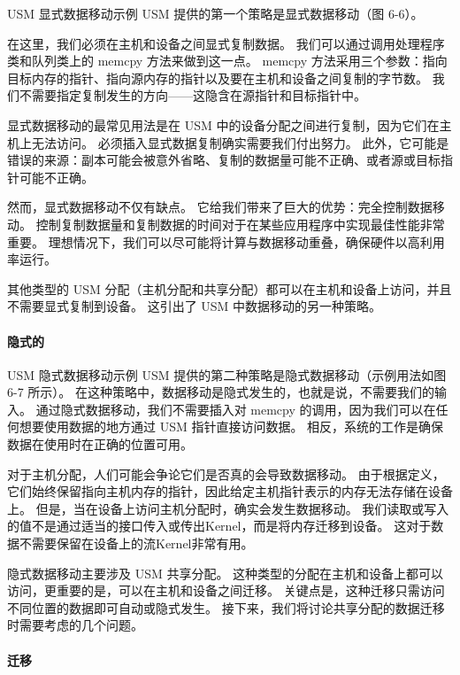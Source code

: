 {\color{red} USM 显式数据移动示例}
USM 提供的第一个策略是显式数据移动（图 6-6）。

在这里，我们必须在主机和设备之间显式复制数据。 我们可以通过调用处理程序类和队列类上的 memcpy 方法来做到这一点。 
memcpy 方法采用三个参数：指向目标内存的指针、指向源内存的指针以及要在主机和设备之间复制的字节数。 
我们不需要指定复制发生的方向——这隐含在源指针和目标指针中。

显式数据移动的最常见用法是在 USM 中的设备分配之间进行复制，因为它们在主机上无法访问。 
必须插入显式数据复制确实需要我们付出努力。 
此外，它可能是错误的来源：副本可能会被意外省略、复制的数据量可能不正确、或者源或目标指针可能不正确。

然而，显式数据移动不仅有缺点。 它给我们带来了巨大的优势：完全控制数据移动。 
控制复制数据量和复制数据的时间对于在某些应用程序中实现最佳性能非常重要。 
理想情况下，我们可以尽可能将计算与数据移动重叠，确保硬件以高利用率运行。

其他类型的 USM 分配（主机分配和共享分配）都可以在主机和设备上访问，并且不需要显式复制到设备。 
这引出了 USM 中数据移动的另一种策略。

\paragraph{隐式的}

{\color{red} USM 隐式数据移动示例}
USM 提供的第二种策略是隐式数据移动（示例用法如图 6-7 所示）。 
在这种策略中，数据移动是隐式发生的，也就是说，不需要我们的输入。 
通过隐式数据移动，我们不需要插入对 memcpy 的调用，因为我们可以在任何想要使用数据的地方通过 USM 指针直接访问数据。 
相反，系统的工作是确保数据在使用时在正确的位置可用。

对于主机分配，人们可能会争论它们是否真的会导致数据移动。 
由于根据定义，它们始终保留指向主机内存的指针，因此给定主机指针表示的内存无法存储在设备上。 
但是，当在设备上访问主机分配时，确实会发生数据移动。 
我们读取或写入的值不是通过适当的接口传入或传出Kernel，而是将内存迁移到设备。 
这对于数据不需要保留在设备上的流Kernel非常有用。

隐式数据移动主要涉及 USM 共享分配。 这种类型的分配在主机和设备上都可以访问，更重要的是，可以在主机和设备之间迁移。 
关键点是，这种迁移只需访问不同位置的数据即可自动或隐式发生。 
接下来，我们将讨论共享分配的数据迁移时需要考虑的几个问题。

\paragraph{迁移}

